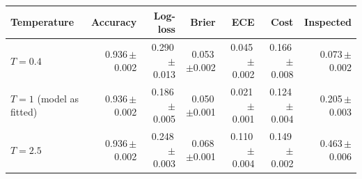\begin{tabular}{lrrrrrr}
\toprule
Temperature & Accuracy & Log-loss & Brier & ECE & Cost & Inspected \\
\midrule
$T=0.4$ & 0.936\,{\scriptsize$\pm$0.002} & 0.290\,{\scriptsize$\pm$0.013} & 0.053\,{\scriptsize$\pm$0.002} & 0.045\,{\scriptsize$\pm$0.002} & 0.166\,{\scriptsize$\pm$0.008} & 0.073\,{\scriptsize$\pm$0.002} \\
$T=1$ (model as fitted) & 0.936\,{\scriptsize$\pm$0.002} & 0.186\,{\scriptsize$\pm$0.005} & 0.050\,{\scriptsize$\pm$0.001} & 0.021\,{\scriptsize$\pm$0.001} & 0.124\,{\scriptsize$\pm$0.004} & 0.205\,{\scriptsize$\pm$0.003} \\
$T=2.5$ & 0.936\,{\scriptsize$\pm$0.002} & 0.248\,{\scriptsize$\pm$0.003} & 0.068\,{\scriptsize$\pm$0.001} & 0.110\,{\scriptsize$\pm$0.004} & 0.149\,{\scriptsize$\pm$0.002} & 0.463\,{\scriptsize$\pm$0.006} \\
\bottomrule
\end{tabular}
